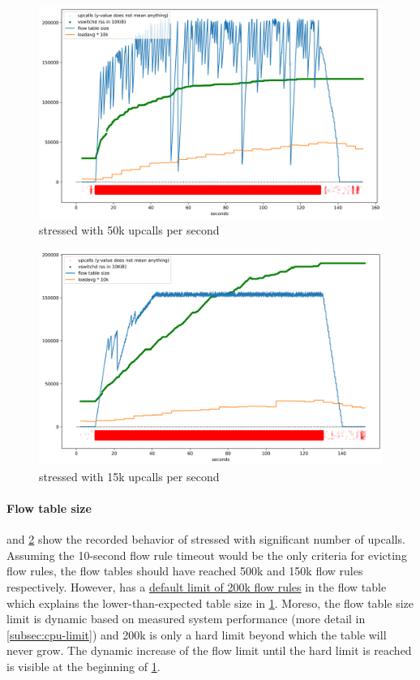 \begin{figure}
    \centering
    \includegraphics[width=.9\linewidth]{img/packet_flood_bare_50k.png}
    \caption{ stressed with 50k upcalls per second}
    \label{fig:plot-packet-flood-bare-50k}
\end{figure}

\begin{figure}
    \centering
    \includegraphics[width=.9\linewidth]{img/packet_flood_bare_15k.png}
    \caption{ stressed with 15k upcalls per second}
    \label{fig:plot-packet-flood-bare-15k}
\end{figure}

\paragraph{Flow table size}
 and \cref{fig:plot-packet-flood-bare-15k} show the recorded behavior of  stressed with significant number of upcalls. Assuming the 10-second flow rule timeout would be the only criteria for evicting flow rules, the flow tables should have reached 500k and 150k flow rules respectively. However,  has a \href{https://github.com/openvswitch/ovs/blob/859071224c590207ca5e1f8723ffdef72ef7b512/ofproto/ofproto.h\#L310}{default limit of 200k flow rules} in the flow table which explains the lower-than-expected table size in \cref{fig:plot-packet-flood-bare-50k}. Moreso, the flow table size limit is dynamic based on measured system performance (more detail in \cref{subsec:cpu-limit}) and 200k is only a hard limit beyond which the table will never grow. The dynamic increase of the flow limit until the hard limit is reached is visible at the beginning of \cref{fig:plot-packet-flood-bare-50k}.

